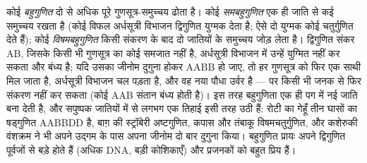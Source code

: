 \begin{definition}[बहुगुणिता]\label{def:b2:genome-diversification:polyploidy}
कोई \emph{बहुगुणित} दो से अधिक पूरे गुणसूत्र-समुच्चय ढोता है।
कोई \emph{समबहुगुणित} एक ही जाति से कई समुच्चय रखता है (कोई विफल
अर्धसूत्री विभाजन द्विगुणित युग्मक देता है; ऐसे दो युग्मक कोई
चतुर्गुणित देते हैं); कोई \emph{विषमबहुगुणित} किसी संकरण के बाद दो
जातियों के समुच्चय जोड़ लेता है। द्विगुणित संकर AB, जिसके किसी भी
गुणसूत्र का कोई समजात नहीं है, अर्धसूत्री विभाजन में उन्हें युग्मित नहीं
कर सकता और बंध्य है; यदि उसका जीनोम दुगुना होकर AABB हो जाए, तो हर
गुणसूत्र को फिर एक साथी मिल जाता है, अर्धसूत्री विभाजन चल पड़ता है, और
वह नया पौधा उर्वर है --- पर किसी भी जनक से फिर संकरण नहीं कर सकता (कोई
AAB संतान बंध्य होती है)। इस तरह बहुगुणिता एक ही पग में नई जाति बना देती
है, और सपुष्पक जातियों में से लगभग एक तिहाई इसी तरह उठी हैं: रोटी का गेहूँ
तीन घासों का षड्गुणित AABBDD है, बाग़ की स्ट्रॉबेरी अष्टगुणित, कपास और
तंबाकू विषमचतुर्गुणित, और कशेरुकी वंशक्रम ने भी अपने उद्गम के पास अपना
जीनोम दो बार दुगुना किया। बहुगुणित प्रायः अपने द्विगुणित पूर्वजों से बड़े
होते हैं (अधिक DNA, बड़ी कोशिकाएँ) और प्रजनकों को बहुत प्रिय हैं।
\end{definition}

